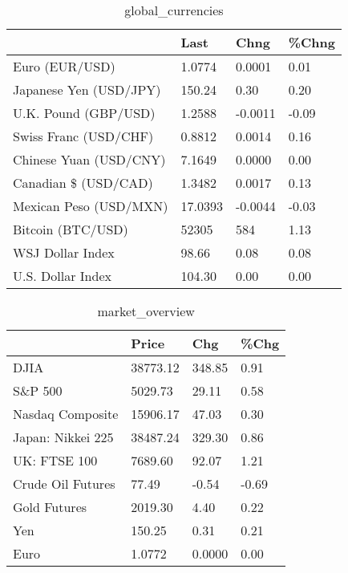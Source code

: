 \documentclass{article}%
\begin{document}
%


\begin{table}[htbp]%
\caption{global\_currencies}%
\centering%
\begin{adjustbox}{width=1\textwidth}%
\begin{tabular}{llll}
\toprule
                       &    Last &    Chng & \%Chng \\
\midrule
        Euro (EUR/USD) &  1.0774 &  0.0001 &  0.01 \\
Japanese Yen (USD/JPY) &  150.24 &    0.30 &  0.20 \\
  U.K. Pound (GBP/USD) &  1.2588 & -0.0011 & -0.09 \\
 Swiss Franc (USD/CHF) &  0.8812 &  0.0014 &  0.16 \\
Chinese Yuan (USD/CNY) &  7.1649 &  0.0000 &  0.00 \\
  Canadian \$ (USD/CAD) &  1.3482 &  0.0017 &  0.13 \\
Mexican Peso (USD/MXN) & 17.0393 & -0.0044 & -0.03 \\
     Bitcoin (BTC/USD) &   52305 &     584 &  1.13 \\
      WSJ Dollar Index &   98.66 &    0.08 &  0.08 \\
     U.S. Dollar Index &  104.30 &    0.00 &  0.00 \\
\bottomrule
\end{tabular}
%
\end{adjustbox}%
\end{table}

%


\begin{table}[htbp]%
\caption{market\_overview}%
\centering%
\begin{adjustbox}{width=1\textwidth}%
\begin{tabular}{llll}
\toprule
                  &    Price &    Chg &  \%Chg \\
\midrule
             DJIA & 38773.12 & 348.85 &  0.91 \\
          S\&P 500 &  5029.73 &  29.11 &  0.58 \\
 Nasdaq Composite & 15906.17 &  47.03 &  0.30 \\
Japan: Nikkei 225 & 38487.24 & 329.30 &  0.86 \\
     UK: FTSE 100 &  7689.60 &  92.07 &  1.21 \\
Crude Oil Futures &    77.49 &  -0.54 & -0.69 \\
     Gold Futures &  2019.30 &   4.40 &  0.22 \\
              Yen &   150.25 &   0.31 &  0.21 \\
             Euro &   1.0772 & 0.0000 &  0.00 \\
\bottomrule
\end{tabular}
%
\end{adjustbox}%
\end{table}

%
\end{document}
